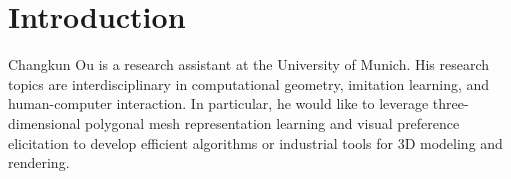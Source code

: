 \section{\textbf{Introduction}}

Changkun Ou is a research assistant at the University of Munich. His research topics are interdisciplinary in 
computational geometry, imitation learning, and human-computer interaction. In particular, 
he would like to leverage three-dimensional polygonal mesh representation learning 
and visual preference elicitation to develop efficient algorithms or industrial tools 
for 3D modeling and rendering.
